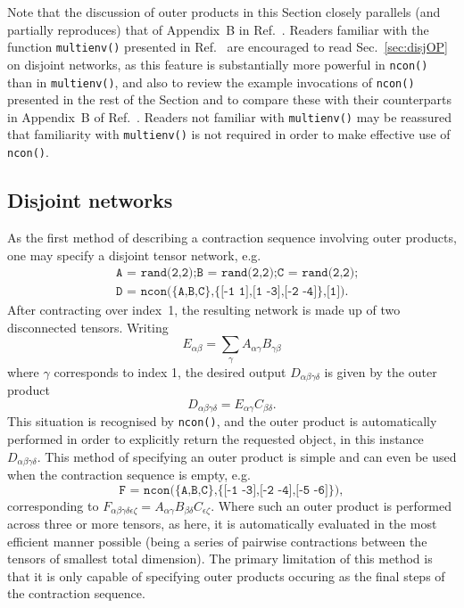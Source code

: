 \documentclass[aps,prb,reprint,superscriptaddress,amsmath,amsfonts]{revtex4-1}
\theoremstyle{definition}
\newcommand{\sref}[1]{Sec.~\ref{#1}}
\newcommand{\rcite}[1]{Ref.~\onlinecite{#1}}
\newcommand{\ttt}[1]{\texttt{#1}}
\begin{document}
Note that the discussion of outer products in this Section closely parallels (and partially reproduces) that of Appendix~B in \rcite{evenbly2013}. Readers familiar with the function \ttt{multienv()} presented in \rcite{evenbly2013} are encouraged to read \sref{sec:disjOP} on disjoint networks, as this feature is substantially more powerful in \ttt{ncon()} than in \ttt{multienv()}, and also to review the example invocations of \ttt{ncon()} presented in the rest of the Section and to compare these with their counterparts in Appendix~B of \rcite{evenbly2013}. Readers not familiar with \ttt{multienv()} may be reassured that familiarity with \ttt{multienv()} is not required in order to make effective use of \ttt{ncon()}.


\subsection{Disjoint networks\label{sec:disjOP}}

As the first method of describing a contraction sequence involving outer products, one may specify a disjoint tensor network, e.g.
\begin{align*}
&\ttt{A = rand(2,2);B = rand(2,2);C = rand(2,2);}\\
&\ttt{D = ncon(\{A,B,C\},\{[-1 1],[1 -3],[-2 -4]\},[1])}.
\end{align*}
After contracting over index~1, the resulting network is made up of two disconnected tensors. Writing
\begin{equation}
E_{\alpha\beta}=\sum_\gamma A_{\alpha\gamma}B_{\gamma\beta}
\end{equation}
where $\gamma$ corresponds to index 1, the desired output $D_{\alpha\beta\gamma\delta}$ is given by the outer product
\begin{equation}
D_{\alpha\beta\gamma\delta} = E_{\alpha\gamma}C_{\beta\delta}.
\end{equation}
This situation is recognised by %
\ttt{ncon()}, and the outer product is automatically performed in order to explicitly return the requested object, in this instance $D_{\alpha\beta\gamma\delta}$. This method of specifying an outer product is simple and can even be used when the contraction sequence is empty, e.g.
\begin{equation*}
\ttt{F = ncon(\{A,B,C\},\{[-1 -3],[-2 -4],[-5 -6]\})},
\end{equation*}
corresponding to $F_{\alpha\beta\gamma\delta\epsilon\zeta}=A_{\alpha\gamma}B_{\beta\delta}C_{\epsilon\zeta}$.
Where such an outer product is performed across three or more tensors, as here, it is automatically evaluated in the most efficient manner possible (being a series of pairwise contractions between the tensors of smallest total dimension). The primary limitation of this method is that it is only capable of specifying outer products occuring as the final steps of the contraction sequence.
\end{document}
